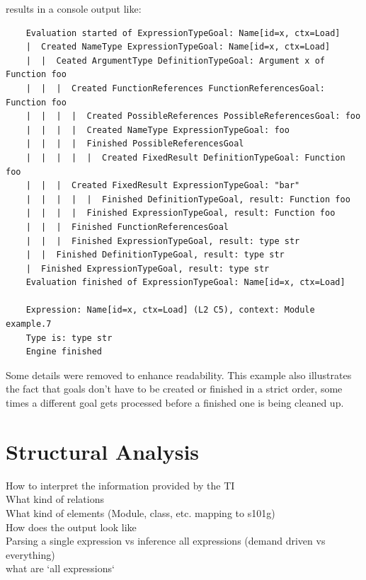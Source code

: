 \documentclass[12pt,halfparskip,DIV11,BCOR10mm]{scrreprt}
\begin{document}
results in a console output like:
\begin{verbatim}
	Evaluation started of ExpressionTypeGoal: Name[id=x, ctx=Load]
	|  Created NameType ExpressionTypeGoal: Name[id=x, ctx=Load]
	|  |  Ceated ArgumentType DefinitionTypeGoal: Argument x of Function foo
	|  |  |  Created FunctionReferences FunctionReferencesGoal: Function foo
	|  |  |  |  Created PossibleReferences PossibleReferencesGoal: foo
	|  |  |  |  Created NameType ExpressionTypeGoal: foo
	|  |  |  |  Finished PossibleReferencesGoal
	|  |  |  |  |  Created FixedResult DefinitionTypeGoal: Function foo
	|  |  |  Created FixedResult ExpressionTypeGoal: "bar"
	|  |  |  |  |  Finished DefinitionTypeGoal, result: Function foo
	|  |  |  |  Finished ExpressionTypeGoal, result: Function foo
	|  |  |  Finished FunctionReferencesGoal
	|  |  |  Finished ExpressionTypeGoal, result: type str
	|  |  Finished DefinitionTypeGoal, result: type str
	|  Finished ExpressionTypeGoal, result: type str
	Evaluation finished of ExpressionTypeGoal: Name[id=x, ctx=Load]

	Expression: Name[id=x, ctx=Load] (L2 C5), context: Module example.7
	Type is: type str
	Engine finished
\end{verbatim}

Some details were removed to enhance readability. This example also illustrates the fact that goals don't have to be created or finished in a strict order, some times a different goal gets processed before a finished one is being cleaned up.




\chapter{Structural Analysis}

How to interpret the information provided by the TI \\
What kind of relations \\
What kind of elements (Module, class, etc. mapping to s101g) \\
How does the output look like \\
Parsing a single expression vs inference all expressions (demand driven vs everything)\\
 what are `all expressions`

\end{document}
